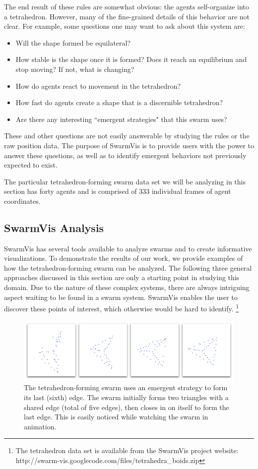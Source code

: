 \documentclass{vgtc}
\begin{document}
The end result of these rules are somewhat obvious: the agents self-organize into a tetrahedron.
However, many of the fine-grained details of this behavior are not clear.
For example, some questions one may want to ask about this system are: 
\begin{itemize}
\item Will the shape formed be equilateral?
\item How stable is the shape once it is formed? Does it reach an equilibrium and stop moving? If not, what is changing?
\item How do agents react to movement in the tetrahedron?
\item How fast do agents create a shape that is a discernible tetrahedron?
\item Are there any interesting ``emergent strategies" that this swarm uses?
\end{itemize}
These and other questions are not easily answerable by studying the rules or the raw position data.
The purpose of SwarmVis is to provide users with the power to answer these questions,
as well as to identify emergent behaviors not previously expected to exist.

The particular tetrahedron-forming swarm data set we will be analyzing in this section has forty agents
and is comprised of 333 individual frames of agent coordinates.

\subsection{SwarmVis Analysis}
SwarmVis has several tools available to analyze swarms and to create informative visualizations.
To demonstrate the results of our work, we provide examples of how the tetrahedron-forming swarm can be analyzed.
The following three general approaches discussed in this section are only a starting point in studying this domain.
Due to the nature of these complex systems, there are always intriguing aspect waiting to be found in a swarm system.
SwarmVis enables the user to discover these points of interest, which otherwise would be hard to identify.
\footnote{The tetrahedron
data set is available from the SwarmVis project website: http://swarm-vis.googlecode.com/files/tetrahedra\_boids.zip}


\begin{figure}
\centering
\includegraphics[scale=.3]{images/tetraclosing.pdf}
\caption{
The tetrahedron-forming swarm uses an emergent strategy to form its last (sixth) edge.
The swarm initially forms two triangles with a shared edge (total of five edges), then
closes in on itself to form the last edge. This is easily noticed while watching the swarm in animation.}
\label{TetraClosing}
\end{figure}
\end{document}
